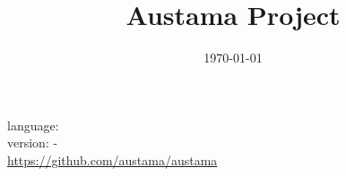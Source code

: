 \documentclass{article}
\begin{document}
\title{Austama Project}
\date{\today}
\maketitle

\begin{center}
language:  \\
version:  -  \\
\url{https://github.com/austama/austama} 
\end{center}
\end{document}
